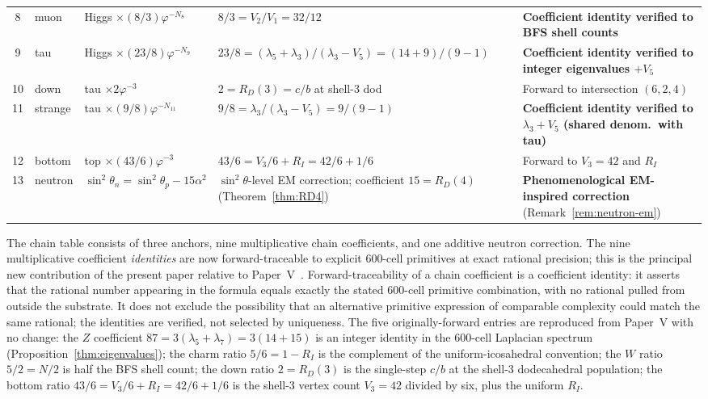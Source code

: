\documentclass[12pt]{article}
\newcommand{\phig}{\varphi}
\begin{document}
\begin{table}[ht]
\begin{tabular}{@{}cllll@{}}
8 & muon & Higgs $\times (8/3)\phig^{-N_8}$ & $8/3 = V_2 / V_1 = 32/12$ & \textbf{Coefficient identity verified to BFS shell counts} \\
9 & tau & Higgs $\times (23/8)\phig^{-N_9}$ & $23/8 = (\lambda_5 + \lambda_3) / (\lambda_3 - V_5) = (14 + 9)/(9 - 1)$ & \textbf{Coefficient identity verified to integer eigenvalues $+ V_5$} \\
10 & down & tau $\times 2\phig^{-3}$ & $2 = R_D(3) = c/b$ at shell-3 dod & Forward to intersection $(6,2,4)$ \\
11 & strange & tau $\times (9/8)\phig^{-N_{11}}$ & $9/8 = \lambda_3 / (\lambda_3 - V_5) = 9 / (9 - 1)$ & \textbf{Coefficient identity verified to $\lambda_3 + V_5$ (shared denom.\ with tau)} \\
12 & bottom & top $\times (43/6)\phig^{-3}$ & $43/6 = V_3/6 + R_I = 42/6 + 1/6$ & Forward to $V_3 = 42$ and $R_I$ \\
13 & neutron & $\sin^2\theta_n = \sin^2\theta_p - 15\alpha^2$ & $\sin^2\theta$-level EM correction; coefficient $15 = R_D(4)$ (Theorem~\ref{thm:RD4}) & \textbf{Phenomenological EM-inspired correction} (Remark~\ref{rem:neutron-em}) \\
\bottomrule
\end{tabular}
\end{table}

The chain table consists of three anchors, nine multiplicative chain coefficients, and one additive neutron correction. The nine multiplicative coefficient \emph{identities} are now forward-traceable to explicit 600-cell primitives at exact rational precision; this is the principal new contribution of the present paper relative to Paper~V~\citep{SmartV}. Forward-traceability of a chain coefficient is a coefficient identity: it asserts that the rational number appearing in the formula equals exactly the stated 600-cell primitive combination, with no rational pulled from outside the substrate. It does not exclude the possibility that an alternative primitive expression of comparable complexity could match the same rational; the identities are verified, not selected by uniqueness. The five originally-forward entries are reproduced from Paper~V with no change: the $Z$ coefficient $87 = 3(\lambda_5 + \lambda_7) = 3(14 + 15)$ is an integer identity in the 600-cell Laplacian spectrum (Proposition~\ref{thm:eigenvalues}); the charm ratio $5/6 = 1 - R_I$ is the complement of the uniform-icosahedral convention; the $W$ ratio $5/2 = N/2$ is half the BFS shell count; the down ratio $2 = R_D(3)$ is the single-step $c/b$ at the shell-3 dodecahedral population; the bottom ratio $43/6 = V_3/6 + R_I = 42/6 + 1/6$ is the shell-3 vertex count $V_3 = 42$ divided by six, plus the uniform $R_I$.
\end{document}
